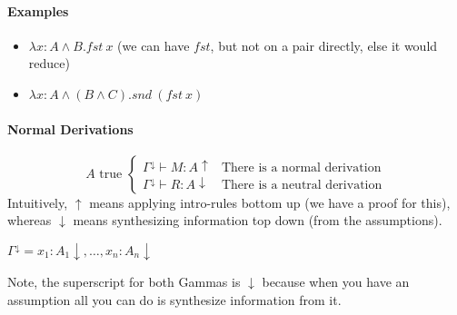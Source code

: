 \documentclass[12 pt]{article}
\begin{document}
	\paragraph{Examples}
	\begin{itemize}
		\item $\lambda x : A \land B.fst \ x$ (we can have $fst$, but
		      not on a pair directly, else it would reduce)
		\item $\lambda x : A \land (B \land C). snd\ (fst\ x)$
	\end{itemize}
	\paragraph{Normal Derivations}
	\begin{equation*}
		A \text{ true }
		\begin{cases}
			\Gamma^{\downarrow} \vdash M:A \uparrow & \text{There is a normal derivation}
			\\ \Gamma^{\downarrow} \vdash R: A \downarrow & \text{There is a neutral derivation}
		\end{cases}
	\end{equation*}
	Intuitively, $\uparrow$ means applying intro-rules bottom
	up (we have a proof for this), whereas $\downarrow$ means
	synthesizing information top
	down (from the assumptions).

$\Gamma^{\downarrow} = x_1:A_1\downarrow, \ldots, x_n : A_n
\downarrow$

	Note, the superscript for both Gammas is $\downarrow$
	because when you have an assumption all you can do is
	synthesize information from it.
\end{document}
